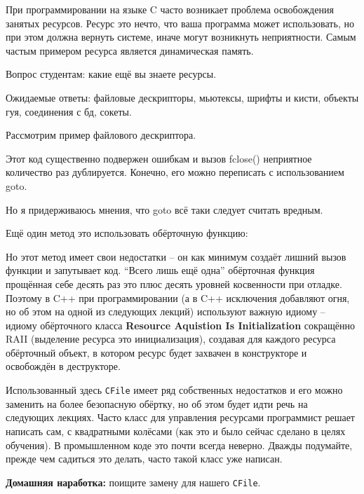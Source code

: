 \documentclass[a4paper,12pt,oneside]{article}
\begin{document}
При программировании на языке C часто возникает проблема освобождения занятых ресурсов. Ресурс это нечто, что ваша программа может использовать, но при этом должна вернуть системе, иначе могут возникнуть неприятности. Самым частым примером ресурса является динамическая память.

Вопрос студентам: какие ещё вы знаете ресурсы.

Ожидаемые ответы: файловые дескрипторы, мьютексы, шрифты и кисти, объекты гуя, соединения с бд, сокеты.

Рассмотрим пример файлового дескриптора.



Этот код существенно подвержен ошибкам и вызов fclose() неприятное количество раз дублируется. Конечно, его можно переписать с использованием goto.



Но я придерживаюсь мнения, что goto всё таки следует считать вредным. 

Ещё один метод это использовать обёрточную функцию:



Но этот метод имеет свои недостатки – он как минимум создаёт лишний вызов функции и запутывает код. ``Всего лишь ещё одна'' обёрточная функция прощённая себе десять раз это плюс десять уровней косвенности при отладке.
Поэтому в C++ при программировании (а в C++ исключения добавляют огня, но об этом на одной из следующих лекций) используют важную идиому – идиому обёрточного класса \textbf{Resource Aquistion Is Initialization} сокращённо RAII (выделение ресурса это инициализация), создавая для каждого ресурса обёрточный объект, в котором ресурс будет захвачен в конструкторе и освобождён в деструкторе.



Использованный здесь \lstinline!CFile! имеет ряд собственных недостатков и его можно заменить на более безопасную обёртку, но об этом будет идти речь на следующих лекциях. Часто класс для управления ресурсами программист решает написать сам, с квадратными колёсами (как это и было сейчас сделано в целях обучения). В промышленном коде это почти всегда неверно. Дважды подумайте, прежде чем садиться это делать, часто такой класс уже написан.

\textbf{Домашняя наработка:} поищите замену для нашего \lstinline!CFile!.
\end{document}
